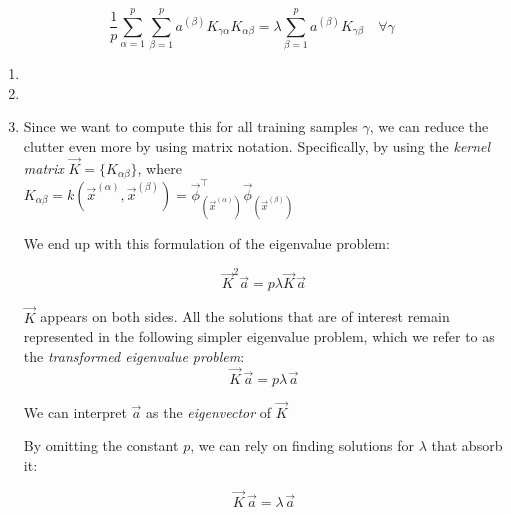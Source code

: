 \begin{frame}{\subsubsecname}
\pause

\newpage


\begin{equation} \label{eq:eigK}
\frac{1}{p} \sum_{\alpha=1}^{p} \sum^{p}_{\beta=1} 
a^{(\beta)}
K_{\gamma \alpha}
K_{\alpha \beta}
 = \lambda 
\sum^{p}_{\beta=1} a^{(\beta)} 
K_{\gamma \beta} \quad \forall \gamma
\end{equation}




\end{frame}

\begin{enumerate}
\item 

\item 

\item 









Since we want to compute this for all training samples $\gamma$, 
we can reduce the clutter even more by using matrix notation. 
Specifically, by using the \emph{kernel matrix} $\vec K=\{K_{\alpha\beta}\}$, where \\
$
K_{\alpha \beta} = 
k(\vec x^{(\alpha)}, \vec x^{(\beta)}) = 
\vec{\phi}_{(\vec{x}^{(\alpha)})}^\top 
		\vec{\phi}_{(\vec{x}^{(\beta)})}
$ 

We end up with this formulation of the eigenvalue problem:

\begin{equation*}
	\vec{K}^2 \vec{a} = p \lambda \vec{K} \mspace{2mu} \vec{a}
\end{equation*}

$\vec K$ appears on both sides. All the solutions that are of interest remain represented in 
the following simpler eigenvalue problem, which we refer to as the \emph{transformed eigenvalue problem}:
\begin{equation}
\label{eq:eigsimple1}
	\vec{K} \, \vec{a} = p \lambda \mspace{2mu} \vec{a}
\end{equation}

We can interpret $\vec a$ as the \emph{eigenvector} of $\vec K$

By omitting the constant $p$, we can rely on finding solutions for $\lambda$ that absorb it:

\begin{equation}
\label{eq:eigsimple2}
	\vec{K} \, \vec{a} = \lambda \mspace{2mu} \vec{a}
\end{equation}


\end{enumerate}

